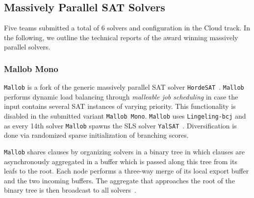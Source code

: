 \documentclass{elsarticle}
\newcommand{\solver}[1]{\texttt{#1}}
\begin{document}
\subsection{Massively Parallel SAT Solvers}
\label{sec:part:cloud}

Five teams submitted a total of $6$ solvers and configuration in the Cloud track. 
In the following, we outline the technical reports of the award winning massively parallel solvers. 



\subsubsection{Mallob Mono}

\solver{Mallob} is a fork of the generic massively parallel SAT solver \solver{HordeSAT}~\cite{Balyo:2015:HordeSATs}. 
\solver{Mallob} performs dynamic load balancing through \emph{malleable job scheduling} in case the input contains several SAT instances of varying priority. 
This functionality is disabled in the submitted variant \solver{Mallob Mono}. 
\solver{Mallob} uses \solver{Lingeling-bcj} and as every 14th solver \solver{Mallob} spawns the SLS solver \solver{YalSAT}~\cite{Biere:2018:LingelingYalsat}.
Diversification is done via randomized sparse initialization of branching scores. 

\solver{Mallob} shares clauses by organizing solvers in a binary tree in which clauses are asynchronously aggregated in a buffer which is passed along this tree from its leafs to the root. 
Each node performs a three-way merge of its local export buffer and the two incoming buffers. 
The aggregate that approaches the root of the binary tree is then broadcast to all solvers~\cite{Schreiber:SC2020}. 
\end{document}

